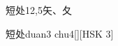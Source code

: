 \begin{entry}{短处}{12,5}{⽮、⼡}
  \begin{phonetics}{短处}{duan3 chu4}[][HSK 3]
  \end{phonetics}
\end{entry}
